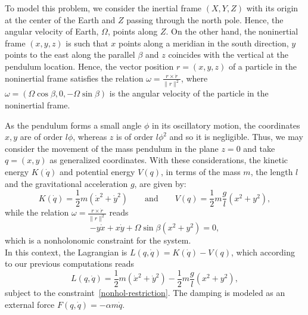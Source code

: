 \documentclass{aims}
\numberwithin{equation}{section}
\theoremstyle{definition}
\begin{document}
To model this problem, we consider the inertial frame $(X, Y, Z)$ with its origin at the center of the Earth and $Z$ passing through the north pole. Hence, the angular velocity of Earth, $\Omega$, points along $Z$. On the other hand, the noninertial frame $(x, y, z)$ is such that $x$ points along a meridian in the south direction, $y$ points to the east along the parallel $\beta$ and $z$ coincides with the vertical at the pendulum location. Hence, the vector position $r = (x, y, z)$ of a particle in the noninertial frame satisfies the relation $\omega = \frac{r\times \dot{r}}{\|r\|^2}$, where $\omega = (\Omega \cos \beta, 0, -\Omega \sin \beta)$ is the angular velocity of the particle in the noninertial frame. 

As the pendulum forms a small angle $\phi$ in its oscillatory motion, the
coordinates $x, y$ are of order $l \phi$, whereas $z$ is of order $l \phi^2$
and so it is negligible. Thus, we may consider the
movement of the mass pendulum in the plane ${z=0}$ and take $q = (x, y)$ as generalized coordinates. With these considerations, the kinetic energy $K(\dot{q})$ and potential energy $V(q)$, in terms of the mass $m$, the length $l$ and the gravitational acceleration $g$, are given by:
\begin{equation}\label{energy-Foucault}
  K(\dot{q}) = \frac{1}{2}m(\dot{x}^2+\dot{y}^2)\qquad\text{and}\qquad V(q)= \frac{1}{2} m \frac{g}{l} (x^2 + y^2),
\end{equation}
while the relation $\omega = \frac{r\times \dot{r}}{\|r\|^2}$ reads
\begin{equation}\label{nonhol-restriction}
  - y \dot{x} + x \dot{y} + \Omega \sin \beta (x^2 + y^2) = 0,
\end{equation}
which is a nonholonomic constraint for the system.\\

 In this context, the Lagrangian is $L(q, \dot{q}) = K(\dot{q})-V(q)$, which according to our previous computations reads
\begin{equation}\label{eq:LD-Foucault}
  L(q, \dot{q}) = \frac{1}{2} m (\dot{x}^2 + \dot{y}^2) - \frac{1}{2} m
  \frac{g}{l} (x^2 + y^2),
\end{equation}
subject to the constraint~\eqref{nonhol-restriction}. The damping is modeled as an external force $F(q, \dot{q})=-\alpha m\dot{q}$.
\end{document}
